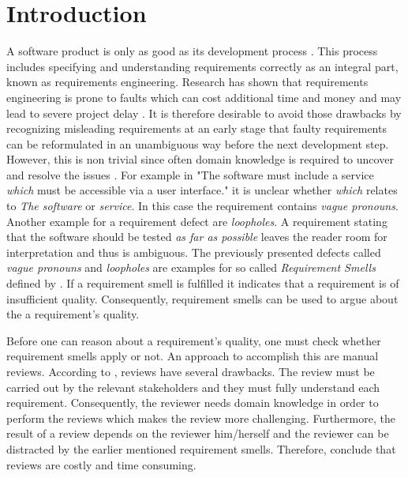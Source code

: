 
\chapter{Introduction}
\label{chp:introduction}

A software product is only as good as its development process \parencite{Hsia:1993}.
This process includes specifying and understanding requirements correctly as an integral part, known as requirements engineering.
Research has shown that requirements engineering is prone to faults which can cost additional time and money \parencite{Mendez:2006} and may lead to severe project delay \parencite{Femmer:2014}.
It is therefore desirable to avoid those drawbacks by recognizing misleading requirements at an early stage that faulty requirements can be reformulated in an unambiguous way before the next development step.
However, this is non trivial since often domain knowledge is required to uncover and resolve the issues \parencite{Femmer:2017}.
For example in "The software must include a service \textit{which} must be accessible via a user interface." it is unclear whether \textit{which} relates to \textit{The software} or \textit{service}.
In this case the requirement contains \textit{vague pronouns}.
Another example for a requirement defect are \textit{loopholes}.
A requirement stating that the software should be tested \textit{as far as possible} leaves the reader room for interpretation and thus is ambiguous.
The previously presented defects called \textit{vague pronouns} and \textit{loopholes} are examples for so called \textit{Requirement Smells} defined by \textcite{Femmer:2017}.
If a requirement smell is fulfilled it indicates that a requirement is of insufficient quality.
Consequently, requirement smells can be used to argue about the a requirement's quality.

Before one can reason about a requirement's quality, one must check whether requirement smells apply or not.
An approach to accomplish this are manual reviews.
According to \textcite{Salger:2013}, reviews have several drawbacks.
The review must be carried out by the relevant stakeholders and they must fully understand each requirement.
Consequently, the reviewer needs domain knowledge in order to perform the reviews which makes the review more challenging.
Furthermore, the result of a review depends on the reviewer him/herself \parencite{Zelkowitz:1983} and the reviewer can be distracted by the earlier mentioned requirement smells.
Therefore, \textcite{Femmer:2017} conclude that reviews are costly and time consuming.

